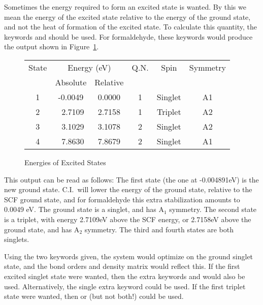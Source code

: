 Sometimes the energy required to form an excited state is wanted.  By this
we mean the energy of the excited state relative to the energy of the ground
state, and not the heat of formation of the excited state.  To calculate this
quantity, the keywords  and
 should be used.  For
formaldehyde, these keywords would produce the output shown in Figure~\ref{figch2o}.
\begin{figure}
\begin{makeimage}
\end{makeimage}
\caption{\label{figch2o} Energies of Excited States}
\begin{center}
\begin{tabular}{cccccc}         \hline
  State &  \multicolumn{2}{c}{Energy (eV)}     &  Q.N.&  Spin &  Symmetry  \\
        & Absolute  &  Relative  \\  \hline
    1 & -0.0049   &  0.0000    &  1 & Singlet  &  A1  \\
    2 &  \ 2.7109   &  2.7158    &  1 & Triplet  &  A2  \\
    3 &  \ 3.1029   &  3.1078    &  2 & Singlet  &  A2  \\
    4 &  \ 7.8630   &  7.8679    &  2 & Singlet  &  A1  \\
\hline
\end{tabular}
\end{center}
\end{figure}
This output can be read as follows:  The first state (the one at -0.004891eV)
is the new ground state.  C.I.\ will lower the energy of the ground state,
relative to the SCF ground state, and for formaldehyde this extra stabilization
amounts to 0.0049 eV.  The ground state is a singlet, and has A$_1$ symmetry.
The second state is a triplet, with energy 2.7109eV above the SCF energy, or
2.7158eV above the ground state, and has A$_2$ symmetry.  The third and fourth
states are both singlets.

Using the two keywords given, the system would optimize on the ground singlet
state, and the bond orders and density matrix would reflect this.   If the
first excited singlet state were wanted, then the extra keywords 
and  would also be used.  Alternatively, the single extra keyword
 could be used.  If the first triplet state were wanted, then
 or  (but not both!) could be used.

